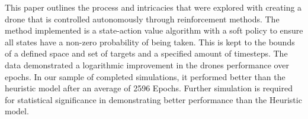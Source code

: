 This paper outlines the process and intricacies that were explored with creating a drone that is controlled autonomously through reinforcement methods. The method implemented is a state-action value algorithm with a soft policy to ensure all states have a non-zero probability of being taken. This is kept to the bounds of a defined space and set of targets and a specified amount of timesteps. The data demonstrated a logarithmic improvement in the drones performance over epochs. In our sample of completed simulations, it performed better than the heuristic model after an average of 2596 Epochs. Further simulation is required for statistical significance in demonstrating better performance than the Heuristic model. 